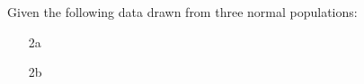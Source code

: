 Given the following data drawn from three normal populations:

\begin{enumerate}

    \item[2a] 
    \pagebreak
    \item[2b] 
 
\end{enumerate} 
